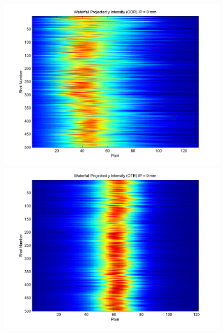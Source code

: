 \documentclass[12pt]{article}
\begin{document}
\begin{figure}
\begin{center}
\includegraphics[scale=0.5]{Figures/ProjY_wfall_ODR_0.PNG}
\includegraphics[scale=0.5]{Figures/ProjY_wfall_OTR_0.PNG}
\caption{}
\end{center}
\end{figure}
\end{document}

